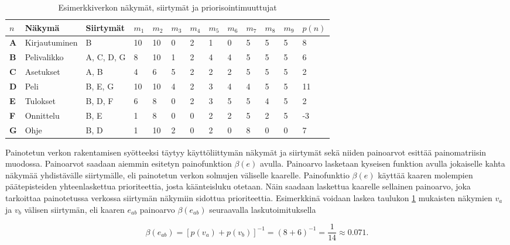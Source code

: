  \begin{table}[H]
    \caption{Esimerkkiverkon näkymät, siirtymät ja priorisointimuuttujat}
    \label{tab:esimerkki_verkon_priorisointi_muuttujat}
    \centering
    \begin{tabular}{l|l|l|l|l|l|l|l|l|l|l|l|l} \hline
    \(n\) & \textbf{Näkymä} & \textbf{Siirtymät} & \(m_1\) & \(m_2\) & \(m_3\) & \(m_4\) & \(m_5\) & \(m_6\) & \(m_7\) & \(m_8\) & \(m_9\) & \(p(n)\) \\ \hline
    \textbf{A} & Kirjautuminen & B & 10 & 10 & 0 & 2 & 1 & 0 & 5 & 5 & 5 & 8 \\
    \textbf{B} & Pelivalikko & A, C, D, G & 8 & 10 & 1 & 2 & 4 & 4 & 5 & 5 & 5 & 6 \\
    \textbf{C} & Asetukset & A, B & 4 & 6 & 5 & 2 & 2 & 2 & 5 & 5 & 5 & 2 \\
    \textbf{D} & Peli & B, E, G & 10 & 10 & 4 & 2 & 3 & 4 & 4 & 5 & 5 & 11 \\
    \textbf{E} & Tulokset & B, D, F & 6 & 8 & 0 & 2 & 3 & 5 & 5 & 4 & 5 & 2 \\
    \textbf{F} & Onnittelu & B, E & 1 & 8 & 0 & 0 & 2 & 2 & 5 & 2 & 5 & -3 \\
    \textbf{G} & Ohje & B, D & 1 & 10 & 2 & 0 & 2 & 0 & 8 & 0 & 0 & 7 \\ \hline
    \end{tabular}
  \end{table}

  Painotetun verkon rakentamisen syötteeksi täytyy käyttöliittymän näkymät ja siirtymät sekä niiden painoarvot esittää painomatriisin muodossa.
  Painoarvot saadaan aiemmin esitetyn painofunktion \(\beta(e)\) avulla.
  Painoarvo lasketaan kyseisen funktion avulla jokaiselle kahta näkymää yhdistävälle siirtymälle, eli painotetun verkon solmujen väliselle kaarelle.
  Painofunktio \(\beta(e)\) käyttää kaaren molempien päätepisteiden yhteenlaskettua prioriteettia, josta käänteisluku otetaan.
  Näin saadaan laskettua kaarelle sellainen painoarvo, joka tarkoittaa painotetussa verkossa siirtymän näkymiin sidottua prioriteettia.
  Esimerkkinä voidaan laskea taulukon \ref{tab:esimerkki_verkon_priorisointi_muuttujat} mukaisten näkymien \(v_a\) ja \(v_b\) välisen siirtymän, eli kaaren \(e_{ab}\) painoarvo \(\beta(e_{ab})\) seuraavalla laskutoimituksella

  \begin{equation} \label{eq:5_5_1}
    \beta(e_{ab}) = [p(v_a) + p(v_b)]^{-1} = (8 + 6)^{-1} = \frac{1}{14} \approx 0.071
    \text{.}
  \end{equation}

